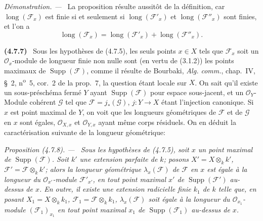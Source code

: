 \documentclass[10pt,oneside]{book}
\newenvironment{env}[1][]{\par\medskip\noindent\textbf{(#1)}\ }{\par}
\newenvironment{proposition}[1][]{%
  \par\medskip\noindent\itshape Proposition (#1). ---\ }{\par}
\newenvironment{proof}{%
  \par\medskip\noindent\textit{Démonstration. ---\ }}{\par}
\begin{document}
\begin{proof}
La proposition résulte aussitôt de la définition, car
$\operatorname{long}(\mathscr F_x)$ est finie si et seulement si
$\operatorname{long}(\mathscr F'_x)$ et
$\operatorname{long}(\mathscr F''_x)$ sont finies, et l'on a
\[
\operatorname{long}(\mathscr F_x)
=\operatorname{long}(\mathscr F'_x)+\operatorname{long}(\mathscr F''_x).
\]
\end{proof}

\begin{env}[4.7.7]
\label{IV.2.4.7.7-fr}
Sous les hypothèses de (4.7.5), les seuls points $x\in X$ tels que
$\mathscr F_x$ soit un $\mathcal O_x$-module de longueur finie non nulle sont
(en vertu de (3.1.2)) les points maximaux de
$\operatorname{Supp}(\mathscr F)$, comme il résulte de Bourbaki,
\emph{Alg. comm.}, chap.~IV, \S~2, n\textsuperscript{o}~5, cor.~2 de la
prop.~7, la question étant locale sur $X$. On sait qu'il existe un
sous-préschéma fermé $Y$ ayant $\operatorname{Supp}(\mathscr F)$ pour espace
sous-jacent, et un $\mathcal O_Y$-Module cohérent $\mathscr G$ tel que
$\mathscr F=j_*(\mathscr G)$, $j:Y\to X$ étant l'injection canonique. Si $x$
est point maximal de $Y$, on voit que les longueurs géométriques de
$\mathscr F$ et de $\mathscr G$ en $x$ sont égales, $\mathcal O_{X,x}$ et
$\mathcal O_{Y,x}$ ayant même corps résiduels. On en déduit la caractérisation
suivante de la longueur géométrique:
\end{env}

\begin{proposition}[4.7.8]
\label{IV.2.4.7.8-fr}
Sous les hypothèses de (4.7.5), soit $x$ un point maximal de
$\operatorname{Supp}(\mathscr F)$. Soit $k'$ une extension parfaite de $k$;
posons $X'=X\otimes_k k'$, $\mathscr F'=\mathscr F\otimes_k k'$; alors la
longueur géométrique $\lambda_x(\mathscr F)$ de $\mathscr F$ en $x$ est égale
à la longueur du $\mathcal O_{x'}$-module $\mathscr F'_{x'}$, en tout point
maximal $x'$ de $\operatorname{Supp}(\mathscr F')$ au-dessus de $x$. En outre,
il existe une extension radicielle finie $k_1$ de $k$ telle que, en posant
$X_1=X\otimes_k k_1$, $\mathscr F_1=\mathscr F\otimes_k k_1$,
$\lambda_x(\mathscr F)$ soit égale à la longueur du
$\mathcal O_{x_1}$-module $(\mathscr F_1)_{x_1}$ en tout point maximal $x_1$
de $\operatorname{Supp}(\mathscr F_1)$ au-dessus de $x$.
\end{proposition}
\end{document}
